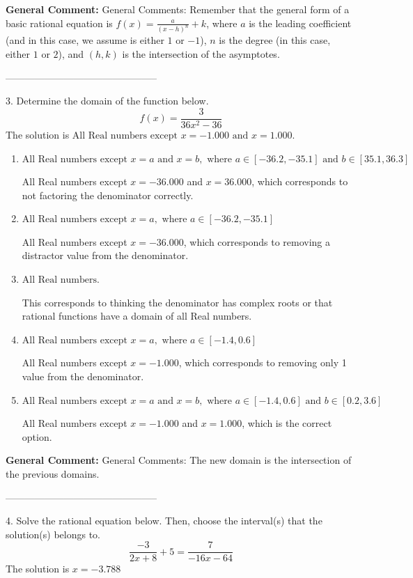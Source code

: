\documentclass{extbook}[14pt]
\begin{document}
\textbf{General Comment:} General Comments: Remember that the general form of a basic rational equation is $ f(x) = \frac{a}{(x-h)^n} + k$, where $a$ is the leading coefficient (and in this case, we assume is either $1$ or $-1$), $n$ is the degree (in this case, either $1$ or $2$), and $(h, k)$ is the intersection of the asymptotes. 

-----------------------------------------------

3. Determine the domain of the function below.
\[ f(x) = \frac{3}{36x^{2} -36} \] 
The solution is $ \text{All Real numbers except } x = -1.000 \text{ and } x = 1.000. $ 

\begin{enumerate}[label=\Alph*.] 
\item $ \text{All Real numbers except } x = a \text{ and } x = b, \text{ where } a \in [-36.2, -35.1] \text{ and } b \in [35.1, 36.3] $ 

 All Real numbers except $x = -36.000$ and $x = 36.000$, which corresponds to not factoring the denominator correctly. 
\item $ \text{All Real numbers except } x = a, \text{ where } a \in [-36.2, -35.1] $ 

 All Real numbers except $x = -36.000$, which corresponds to removing a distractor value from the denominator. 
\item $ \text{All Real numbers.} $ 

 This corresponds to thinking the denominator has complex roots or that rational functions have a domain of all Real numbers. 
\item $ \text{All Real numbers except } x = a, \text{ where } a \in [-1.4, 0.6] $ 

 All Real numbers except $x = -1.000$, which corresponds to removing only 1 value from the denominator. 
\item $ \text{All Real numbers except } x = a \text{ and } x = b, \text{ where } a \in [-1.4, 0.6] \text{ and } b \in [0.2, 3.6] $ 

 All Real numbers except $x = -1.000$ and $x = 1.000$, which is the correct option. 
\end{enumerate} 
 
\textbf{General Comment:} General Comments: The new domain is the intersection of the previous domains. 

-----------------------------------------------

4. Solve the rational equation below. Then, choose the interval(s) that the solution(s) belongs to.
\[ \frac{-3}{2x + 8} + 5 = \frac{7}{-16x -64} \] 
The solution is $ x = -3.788 $ 
\end{document}
